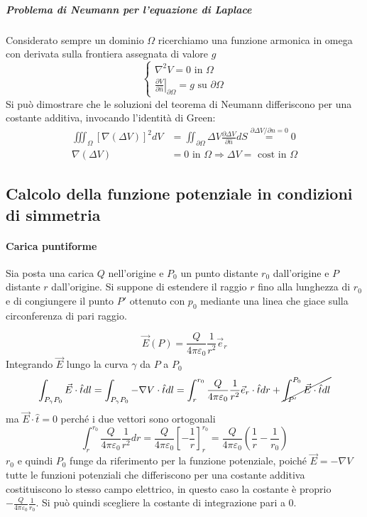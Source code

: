 \subparagraph{Problema di Neumann per l'equazione di Laplace}
Considerato sempre un dominio $\Omega$ ricerchiamo una funzione armonica in omega con derivata 
sulla frontiera assegnata di valore $g$
$$
\begin{cases}
\nabla^2 V = 0 \text{ in } \Omega\\
\left.\frac{\partial V}{\partial\hat{n}}\right|_{\partial \Omega} = g \text{ su } \partial \Omega
\end{cases}
$$
Si può dimostrare che le soluzioni del teorema di Neumann differiscono per una
costante additiva, invocando l'identità di Green:
$$
\begin{aligned}
\iiint_{\Omega} \left[\nabla(\Delta V)\right]^2 dV &= \iint_{\partial\Omega} \Delta V \frac{\partial\Delta V}{\partial \hat{n}} dS \stackrel{\partial\Delta V/\partial n = 0 }{=} 0\\
\nabla(\Delta V) &= 0 \text{ in } \Omega \Rightarrow \Delta V = \text{ cost in }\Omega 
\end{aligned}
$$

\subsection{Calcolo della funzione potenziale in condizioni di simmetria}
\paragraph{Carica puntiforme}
Sia posta una carica $Q$ nell'origine e $P_0$ un punto distante $r_0$ dall'origine e $P$ distante $r$ dall'origine.
Si suppone di estendere il raggio $r$ fino alla lunghezza di $r_0$ e di congiungere il punto $P'$
ottenuto con $p_0$ mediante una linea che giace sulla circonferenza di pari raggio.

$$
\vec{E}(P) = \frac{Q}{4\pi \varepsilon_0}\frac{1}{r^2} \vec{e}_r
$$
Integrando $\vec{E}$ lungo la curva $\gamma$ da $P$ a $P_0$
$$
\int_{P_\gamma P_0} \vec{E}\cdot \hat{t} dl = \int_{P_\gamma P_0} -\nabla V\cdot \hat{t} dl = 
\int_r^{r_0} \frac{Q}{4\pi\varepsilon_0}\frac{1}{r^2} \vec{e}_r\cdot \hat{t} dr + 
\cancel{\int_{P'}^{P_0} \vec{E}\cdot\hat{t} dl}
$$
ma $\vec{E}\cdot\hat{t} = 0$ perché i due vettori sono ortogonali
$$
\int_r^{r_0} \frac{Q}{4\pi\varepsilon_0}\frac{1}{r^2}dr = \frac{Q}{4\pi\varepsilon_0}\left[-\frac{1}{r}\right]_r^{r_0} = \frac{Q}{4\pi\varepsilon_0}\left(\frac{1}{r} - \frac{1}{r_0}\right)
$$
$r_0$ e quindi $P_0$ funge da riferimento per la funzione potenziale, poiché $\vec{E} = -\nabla V$ 
tutte le funzioni potenziali che differiscono per una costante additiva costituiscono lo stesso
campo elettrico, in questo caso la costante è proprio $-\frac{Q}{4\pi\varepsilon_0}\frac{1}{r_0}$.
Si può quindi scegliere la costante di integrazione pari a $0$.

